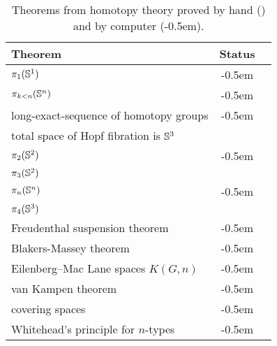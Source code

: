 {
\newcommand{\humancheck}{\ding{52}}
\newcommand{\computercheck}{\ding{52}\kern-0.5em\ding{52}}
\begin{table}[htb]
  \centering
\begin{tabular}{lcc}
\toprule
Theorem         & Status \\
\midrule
$\pi_1(\mathbb{S} ^1)$                     & \computercheck \\
$\pi_{k<n}(\mathbb{S} ^n)$                  & \computercheck \\
long-exact-sequence of homotopy groups & \computercheck    \\
total space of Hopf fibration is $\mathbb{S} ^3$ & \humancheck    \\
$\pi_2(\mathbb{S} ^2)$                     & \computercheck \\
$\pi_3(\mathbb{S} ^2)$                     & \humancheck    \\
$\pi_n(\mathbb{S} ^n)$                     & \computercheck \\
$\pi_4(\mathbb{S} ^3)$                     & \humancheck    \\
Freudenthal suspension theorem      & \computercheck \\
Blakers-Massey theorem              & \computercheck \\
Eilenberg--Mac Lane spaces $K(G,n)$ & \computercheck \\
van Kampen theorem                & \computercheck \\
covering spaces                     & \computercheck \\
Whitehead's principle for $n$-types & \computercheck \\
\bottomrule
\end{tabular}
\caption{Theorems from homotopy theory proved by
  hand (\humancheck) and by computer (\computercheck).}
  \label{tab:theorems}
\end{table}
}

